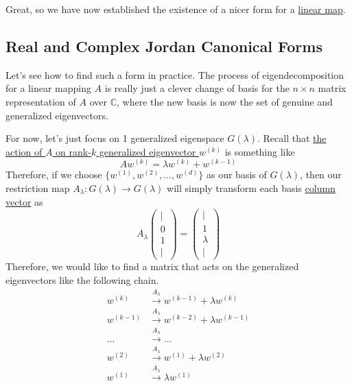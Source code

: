 	Great, so we have now established the existence of a nicer form for a \hyperref[def:linear_map]{linear map}.  

\subsection{Real and Complex Jordan Canonical Forms}

	Let's see how to find such a form in practice. The process of eigendecomposition for a linear mapping $A$ is really just a clever change of basis for the $n \times n$ matrix representation of $A$ over $\mathbb{C}$, where the new basis is now the set of genuine and generalized eigenvectors. 

	For now, let's just focus on 1 generalized eigenspace $G(\lambda)$. Recall that \href{thm:generalized_eigenvector_chain}{the action of $A$ on rank-$k$ generalized eigenvector $w^{(k)}$} is something like 
	\begin{equation}
		A w^{(k)} = \lambda w^{(k)} + w^{(k-1)}
	\end{equation}
	Therefore, if we choose $\{w^{(1)}, w^{(2)}, \ldots, w^{(d)}\}$ as our basis of $G(\lambda)$, then our restriction map $A_\lambda : G(\lambda) \to G(\lambda)$ will simply transform each basis \hyperref[def:column-vector]{column vector} as 
	\begin{equation}
		A_\lambda \begin{pmatrix} | \\ 0 \\ 1 \\ | \end{pmatrix} = \begin{pmatrix} | \\ 1 \\ \lambda \\ | \end{pmatrix}
	\end{equation}
	Therefore, we would like to find a matrix that acts on the generalized eigenvectors like the following chain. 
	\begin{align}
		w^{(k)} & \xrightarrow{A_\lambda} w^{(k-1)} + \lambda w^{(k)} \\ 
		w^{(k-1)} & \xrightarrow{A_\lambda} w^{(k-2)} + \lambda w^{(k-1)} \\ 
		\ldots & \xrightarrow{A_\lambda} \ldots \\ 
		w^{(2)} & \xrightarrow{A_\lambda} w^{(1)} + \lambda w^{(2)} \\ 
		w^{(1)} & \xrightarrow{A_\lambda} \lambda w^{(1)}
	\end{align}

